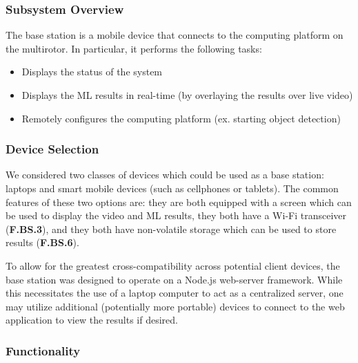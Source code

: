 \subsubsection{Subsystem Overview}

The base station is a mobile device that connects to the computing platform on the multirotor. In particular, it performs the following tasks:
\begin{itemize}
    \item Displays the status of the system
    \item Displays the ML results in real-time (by overlaying the results over live video)
    \item Remotely configures the computing platform (ex. starting object detection)
\end{itemize}

\subsubsection{Device Selection}
We considered two classes of devices which could be used as a base station: laptops and smart mobile devices (such as cellphones or tablets). The common features of these two options are: they are both equipped with a screen which can be used to display the video and ML results, they both have a Wi-Fi transceiver (\textbf{F.BS.3}), and they both have non-volatile storage which can be used to store results (\textbf{F.BS.6}).

To allow for the greatest cross-compatibility across potential client devices, the base station was designed to operate on a Node.js web-server framework. While this necessitates the use of a laptop computer to act as a centralized server, one may utilize additional (potentially more portable) devices to connect to the web application to view the results if desired.

\subsubsection{Functionality}


